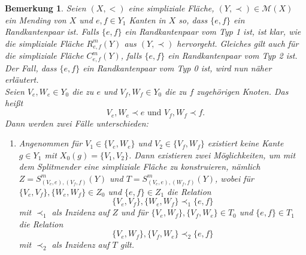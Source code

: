 \documentclass[12pt,titlepage,twoside,cleardoublepage]{article}
\newcommand{\gelb}{0.550000011920929}
\theoremstyle{nummermitklammern}
\newtheorem{bemerkung}[temp]{Bemerkung}
\newtheorem{bemerkung}[zahl]{Bemerkung}
\numberwithin{equation}{section}
\begin{document}
\begin{bemerkung}
Seien $(X,<)$ eine simpliziale Fläche, $(Y,\prec)\in \mathcal{M}(X)$ ein Mending von $X$ und $e,f \in Y_1$ Kanten in $X$ so, dass $\{e,f\}$ ein Randkantenpaar ist.
 Falls $\{e,f\}$ ein Randkantenpaar vom Typ 1 ist, ist klar, wie die simpliziale Fläche $R^m_{e,f}(Y)$ aus $(Y,\prec)$ hervorgeht. Gleiches gilt auch für die simpliziale Fläche $C^m_{e,f}(Y)$, falls $\{e,f\}$ ein Randkantenpaar vom Typ 2 ist.\\
Der Fall, dass $\{e,f\}$ ein Randkantenpaar vom Typ 0 ist, wird nun näher erläutert.\\
Seien $V_e,W_e \in Y_0$ die zu $e$ und $V_f,W_f \in Y_0$ die zu $f$ zugehörigen Knoten. Das heißt
\[
V_e,W_e \prec e \text{ und } V_f,W_f \prec f.
\]  
Dann werden zwei Fälle unterschieden:
\begin{enumerate}
\item Angenommen für $V_1\in \{V_e,W_e\}$ und $V_2 \in \{V_f,W_f\}$ existiert keine Kante $g \in Y_1$ mit $X_0(g)=\{V_1,V_2\}$. Dann existieren zwei Möglichkeiten, um mit dem Splitmender eine simpliziale Fläche zu konstruieren, nämlich $Z=S^m_{(V_e,e),(V_f,f)}(Y)$ und $T=S^m_{(V_e,e),(W_f,f)}(Y)$, 
wobei für $\{V_e,V_f\},\{W_e,W_f\} \in Z_0$ und $\{e,f\} \in Z_1$ die Relation
\[
\{V_e,V_f\},\{W_e,W_f\}\prec_1 \{e,f\}
\] mit $\prec_1$ als Inzidenz auf $Z$ und für $\{V_e, W_f\},\{V_f,W_e\}\in T_0$ und $\{e,f\}\in T_1$ die Relation
\[
\{V_e,W_f\},\{V_f,W_e\}\prec_2 \{e,f\} 
\]  mit $\prec_2$ als Inzidenz auf $T$ gilt.
\begin{figure}[H] 
\end{figure}
\end{enumerate}
\end{bemerkung}
\end{document}
